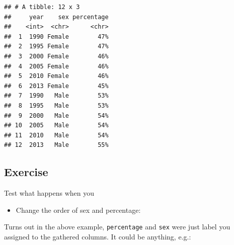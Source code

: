 \documentclass[]{book}
\makeatletter
\newenvironment{Shaded}{\begin{snugshade}}{\end{snugshade}}
\newcommand{\KeywordTok}[1]{\textcolor[rgb]{0.13,0.29,0.53}{\textbf{#1}}}
\newcommand{\StringTok}[1]{\textcolor[rgb]{0.31,0.60,0.02}{#1}}
\newcommand{\OperatorTok}[1]{\textcolor[rgb]{0.81,0.36,0.00}{\textbf{#1}}}
\newcommand{\NormalTok}[1]{#1}
\providecommand{\tightlist}{%
  \setlength{\itemsep}{0pt}\setlength{\parskip}{0pt}}
\newenvironment{kframe}{%
\medskip{}
\setlength{\fboxsep}{.8em}
 \def\at@end@of@kframe{}%
 \ifinner\ifhmode%
  \def\at@end@of@kframe{\end{minipage}}%
  \begin{minipage}{\columnwidth}%
 \fi\fi%
 \def\FrameCommand##1{\hskip\@totalleftmargin \hskip-\fboxsep
 \colorbox{shadecolor}{##1}\hskip-\fboxsep
     \hskip-\linewidth \hskip-\@totalleftmargin \hskip\columnwidth}%
 \MakeFramed {\advance\hsize-\width
   \@totalleftmargin\z@ \linewidth\hsize
   \@setminipage}}%
 {\par\unskip\endMakeFramed%
 \at@end@of@kframe}
\renewenvironment{Shaded}{\begin{kframe}}{\end{kframe}}
\makeatother
\begin{document}
\begin{Shaded}
\end{Shaded}

\begin{verbatim}
## # A tibble: 12 x 3
##     year    sex percentage
##    <int>  <chr>      <chr>
##  1  1990 Female        47%
##  2  1995 Female        47%
##  3  2000 Female        46%
##  4  2005 Female        46%
##  5  2010 Female        46%
##  6  2013 Female        45%
##  7  1990   Male        53%
##  8  1995   Male        53%
##  9  2000   Male        54%
## 10  2005   Male        54%
## 11  2010   Male        54%
## 12  2013   Male        55%
\end{verbatim}

\subsection{Exercise}\label{exercise-20}

Test what happens when you

\begin{itemize}
\tightlist
\item
  Change the order of sex and percentage:
\end{itemize}

\begin{Shaded}
\end{Shaded}

Turns out in the above example, \texttt{percentage} and \texttt{sex}
were just label you assigned to the gathered columns. It could be
anything, e.g.:

\begin{Shaded}
\end{Shaded}
\end{document}
